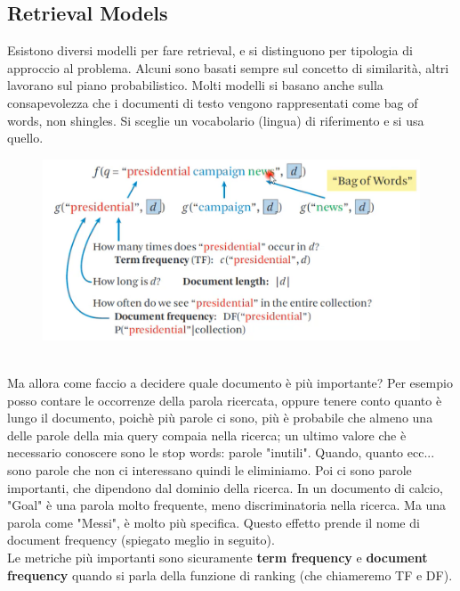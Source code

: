 \subsection{Retrieval Models}
Esistono diversi modelli per fare retrieval, e si distinguono per tipologia di approccio al problema. Alcuni sono basati sempre sul concetto di similarità, altri lavorano sul piano probabilistico. Molti modelli si basano anche sulla consapevolezza che i documenti di testo vengono rappresentati come bag of words, non shingles. Si sceglie un vocabolario (lingua) di riferimento e si usa quello.
\\
\begin{figure}[th]
    \centering
    \includegraphics[scale=0.5]{Text Analysis/img/bagofwords.png}
\end{figure}
\\
Ma allora come faccio a decidere quale documento è più importante? Per esempio posso contare le occorrenze della parola ricercata, oppure tenere conto quanto è lungo il documento, poichè più parole ci sono, più è probabile che almeno una delle parole della mia query compaia nella ricerca; un ultimo valore che è necessario conoscere sono le stop words: parole "inutili". Quando, quanto ecc... sono parole che non ci interessano quindi le eliminiamo. Poi ci sono parole importanti, che dipendono dal dominio della ricerca. In un documento di calcio, "Goal" è una parola molto frequente, meno discriminatoria nella ricerca. Ma una parola come "Messi", è molto più specifica. Questo effetto prende il nome di document frequency (spiegato meglio in seguito). 
\\
Le metriche più importanti sono sicuramente \textbf{term frequency} e \textbf{document frequency} quando si parla della funzione di ranking (che chiameremo TF e DF).

